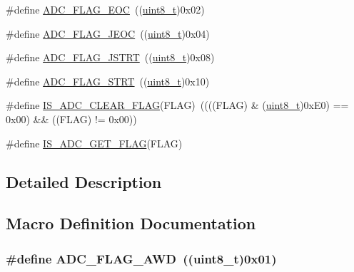 \begin{DoxyCompactItemize}
\item 
\#define \hyperlink{group___a_d_c__flags__definition_gaf2c6fdf7e9ab63b778149e5fb56413d4}{A\+D\+C\+\_\+\+F\+L\+A\+G\+\_\+\+E\+OC}~((\hyperlink{_p_e___types_8h_aba7bc1797add20fe3efdf37ced1182c5}{uint8\+\_\+t})0x02)
\item 
\#define \hyperlink{group___a_d_c__flags__definition_ga4df8eea8ab83d98104ee15a339743a4e}{A\+D\+C\+\_\+\+F\+L\+A\+G\+\_\+\+J\+E\+OC}~((\hyperlink{_p_e___types_8h_aba7bc1797add20fe3efdf37ced1182c5}{uint8\+\_\+t})0x04)
\item 
\#define \hyperlink{group___a_d_c__flags__definition_ga278f4e866f4322c1120bf0db5301c432}{A\+D\+C\+\_\+\+F\+L\+A\+G\+\_\+\+J\+S\+T\+RT}~((\hyperlink{_p_e___types_8h_aba7bc1797add20fe3efdf37ced1182c5}{uint8\+\_\+t})0x08)
\item 
\#define \hyperlink{group___a_d_c__flags__definition_gad0c59ae7749c69b5b91f2c533db1b619}{A\+D\+C\+\_\+\+F\+L\+A\+G\+\_\+\+S\+T\+RT}~((\hyperlink{_p_e___types_8h_aba7bc1797add20fe3efdf37ced1182c5}{uint8\+\_\+t})0x10)
\item 
\#define \hyperlink{group___a_d_c__flags__definition_gac5b6fb60ec921255b05261ec04573470}{I\+S\+\_\+\+A\+D\+C\+\_\+\+C\+L\+E\+A\+R\+\_\+\+F\+L\+AG}(F\+L\+AG)~((((F\+L\+AG) \& (\hyperlink{_p_e___types_8h_aba7bc1797add20fe3efdf37ced1182c5}{uint8\+\_\+t})0x\+E0) == 0x00) \&\& ((\+F\+L\+A\+G) != 0x00))
\item 
\#define \hyperlink{group___a_d_c__flags__definition_ga597eb68dfef9dbe0928ed14a1aedc710}{I\+S\+\_\+\+A\+D\+C\+\_\+\+G\+E\+T\+\_\+\+F\+L\+AG}(F\+L\+AG)
\end{DoxyCompactItemize}


\subsection{Detailed Description}


\subsection{Macro Definition Documentation}
\subsubsection[{\texorpdfstring{A\+D\+C\+\_\+\+F\+L\+A\+G\+\_\+\+A\+WD}{ADC_FLAG_AWD}}]{\setlength{\rightskip}{0pt plus 5cm}\#define A\+D\+C\+\_\+\+F\+L\+A\+G\+\_\+\+A\+WD~(({\bf uint8\+\_\+t})0x01)}\hypertarget{group___a_d_c__flags__definition_gadb75a4b430fb84950232b7a8f3a6a877}{}\label{group___a_d_c__flags__definition_gadb75a4b430fb84950232b7a8f3a6a877}


